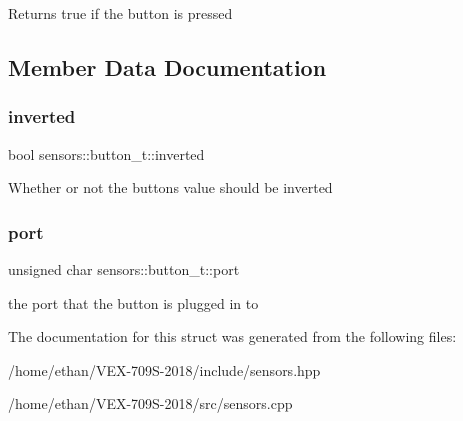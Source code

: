 Returns true if the button is pressed 

\subsection{Member Data Documentation}
\mbox{\label{structsensors_1_1button__t_a9d219ff98b6f74e5f4fcbd987f419484}} 
\subsubsection{\texorpdfstring{inverted}{inverted}}
{\footnotesize\ttfamily bool sensors\+::button\+\_\+t\+::inverted}

Whether or not the button\textquotesingle{}s value should be inverted \mbox{\label{structsensors_1_1button__t_ad100f6e3b4333b9271e597d940e18852}} 
\subsubsection{\texorpdfstring{port}{port}}
{\footnotesize\ttfamily unsigned char sensors\+::button\+\_\+t\+::port}

the port that the button is plugged in to 

The documentation for this struct was generated from the following files\+:\begin{DoxyCompactItemize}
\item 
/home/ethan/\+V\+E\+X-\/709\+S-\/2018/include/sensors.\+hpp\item 
/home/ethan/\+V\+E\+X-\/709\+S-\/2018/src/sensors.\+cpp\end{DoxyCompactItemize}
